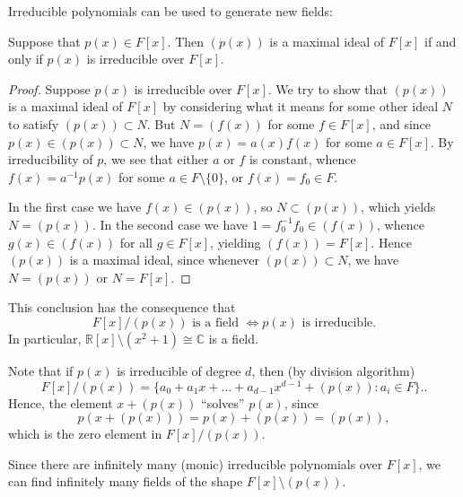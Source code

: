 Irreducible polynomials can be used to generate new fields:
\begin{theorem}
	Suppose that $p(x) \in F[x]$. Then $\left( p(x) \right) $ is a maximal ideal of $F[x]$ if and only if $p(x)$ is irreducible over $F[x]$.
\end{theorem}
\begin{proof}
	Suppose $p(x)$ is irreducible over $F[x]$. We try to show that $\left( p(x) \right) $ is a maximal ideal of $F[x]$ by considering what it means for some other ideal $N$ to satisfy $\left( p(x) \right) \subset N$. But $N = \left( f(x) \right) $ for some $f \in F[x]$, and since $p(x) \in \left( p(x) \right) \subset N$, we have $p(x) = a(x) f(x)$ for some $a \in F[x]$. By irreducibility of $p$, we see that either $a $ or $f$ is constant, whence $f(x) = a^{-1} p(x)$ for some $a \in F \setminus  \{0\} $, or $f(x) = f_0 \in F$. 

	In the first case we have $f(x) \in \left( p(x) \right) $, so $N \subset \left( p(x) \right) $, which yields $N = \left( p(x) \right) $. In the second case we have $1 = f_0^{-1} f_0 \in \left( f(x) \right) $, whence $g(x) \in \left( f(x) \right) $ for all $g \in F[x]$, yielding $\left( f(x) \right)  = F[x]$. Hence $\left( p(x) \right) $ is a maximal ideal, since whenever $\left( p(x) \right) \subset N$, we have $N = \left( p(x) \right) $ or $N = F[x]$.
\end{proof}

\begin{remark}
This conclusion has the consequence that 
\[
	F[x] / \left( p(x) \right) \text{ is a field } \iff 
	p(x) \text{ is irreducible}
.\] 
In particular, $\mathbb{R}[x] \setminus \left( x^2 + 1 \right)  \cong \mathbb{C}$ is a field.

Note that if $p(x)$ is irreducible of degree $d$, then (by division algorithm)
\[
	F[x] / \left( p(x) \right) =
	\{a_0+a_1x + \ldots + a_{d-1 }x^{d-1} + \left( p(x) \right) : a_i \in F\} .
.\] 
Hence, the element $x + \left( p(x) \right) $ ``solves'' $p(x)$, since
\[
	p(x + \left( p(x) \right) ) = p(x) + \left( p(x) \right)  = \left( p(x) \right)
,\] 
which is the zero element in $F[x] / \left( p(x) \right) $.
	
\end{remark}
\begin{remark}
	Since there are infinitely many (monic) irreducible polynomials over $F[x]$, we can find infinitely many fields of the shape $F[x]\setminus \left( p(x) \right)$. 
\end{remark}

